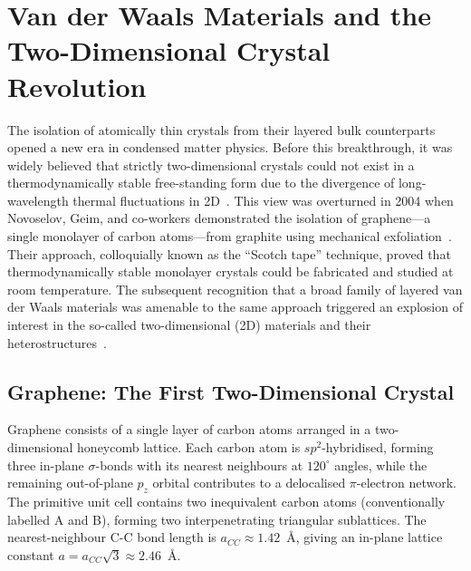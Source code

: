 


\section{Van der Waals Materials and the Two-Dimensional Crystal Revolution}
\label{sec:vdW_materials}

The isolation of atomically thin crystals from their layered bulk counterparts opened a new era in condensed matter physics.
Before this breakthrough, it was widely believed that strictly two-dimensional crystals could not exist in a thermodynamically stable free-standing form due to the divergence of long-wavelength thermal fluctuations in 2D~\cite{peierls-1935,mermin-1968}.
This view was overturned in 2004 when Novoselov, Geim, and co-workers demonstrated the isolation of graphene---a single monolayer of carbon atoms---from graphite using mechanical exfoliation~\cite{novoselov-2004}.
Their approach, colloquially known as the ``Scotch tape'' technique, proved that thermodynamically stable monolayer crystals could be fabricated and studied at room temperature.
The subsequent recognition that a broad family of layered van der Waals materials was amenable to the same approach triggered an explosion of interest in the so-called two-dimensional (2D) materials and their heterostructures~\cite{novoselov-2005}.


\subsection{Graphene: The First Two-Dimensional Crystal}
\label{sec:graphene}

Graphene consists of a single layer of carbon atoms arranged in a two-dimensional honeycomb lattice.
Each carbon atom is $sp^2$-hybridised, forming three in-plane $\sigma$-bonds with its nearest neighbours at $120^\circ$ angles, while the remaining out-of-plane $p_z$ orbital contributes to a delocalised $\pi$-electron network.
The primitive unit cell contains two inequivalent carbon atoms (conventionally labelled A and B), forming two interpenetrating triangular sublattices.
The nearest-neighbour C-C bond length is $a_{CC} \approx 1.42$~\AA, giving an in-plane lattice constant $a = a_{CC}\sqrt{3} \approx 2.46$~\AA.

